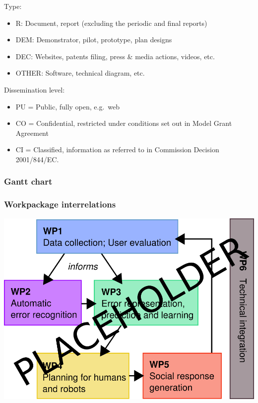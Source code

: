 \documentclass[]{article}
\begin{document}
Type:

\begin{itemize}

\item
  R: Document, report (excluding the periodic and final reports)
\item
  DEM: Demonstrator, pilot, prototype, plan designs
\item
  DEC: Websites, patents filing, press \& media actions, videos, etc.
\item
  OTHER: Software, technical diagram, etc.
\end{itemize}

Dissemination level:

\begin{itemize}

\item
  PU = Public, fully open, e.g.~web
\item
  CO = Confidential, restricted under conditions set out in Model Grant
  Agreement
\item
  CI = Classified, information as referred to in Commission Decision
  2001/844/EC.
\end{itemize}

\subsubsection{Gantt chart}\label{gantt-chart}



\subsubsection{Workpackage interrelations}\label{workpackage-interrelations}

\includegraphics{figs/wp-interrelations.png}\\
\end{document}
